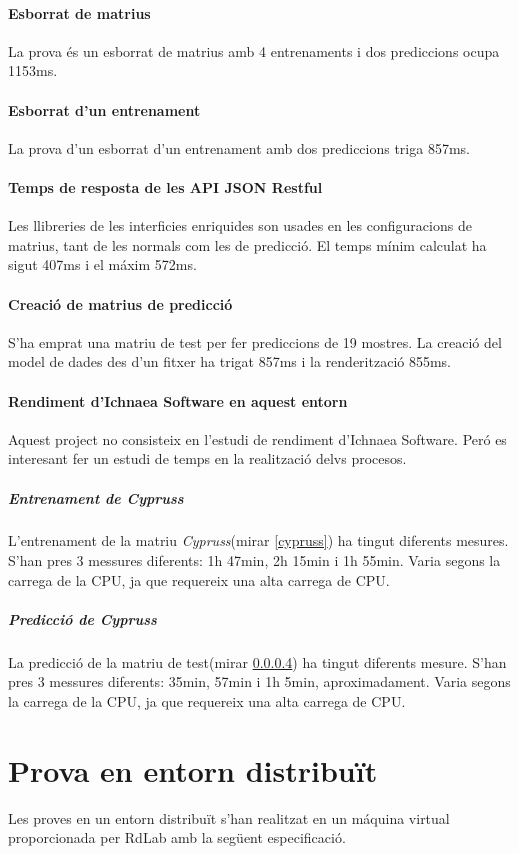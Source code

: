 \paragraph{Esborrat de matrius}
La prova \'{e}s un esborrat de matrius amb 4 entrenaments i dos prediccions ocupa 1153ms.

\paragraph{Esborrat d'un entrenament}
La prova d'un esborrat d'un entrenament amb dos prediccions triga 857ms.

\paragraph{Temps de resposta de les API JSON Restful}
Les llibreries de les interficies enriquides son usades en les configuracions de matrius, tant de les normals com les de predicci\'{o}. El temps m\'{i}nim calculat ha sigut 407ms i el m\'{a}xim 572ms.

\paragraph{Creaci\'{o} de matrius de predicci\'{o}}
\label{cypruss_test}
S'ha emprat una matriu de test per fer prediccions de 19 mostres. La creaci\'{o} del model de dades des d'un fitxer ha trigat 857ms i la renderitzaci\'{o} 855ms.

\paragraph{Rendiment d'Ichnaea Software en aquest entorn}
Aquest project no consisteix en l'estudi de rendiment d'Ichnaea Software. Per\'{o} es interesant fer un estudi de temps en la realitzaci\'{o} delvs procesos.

\subparagraph{Entrenament de \textit{Cypruss}}
L'entrenament de la matriu \textit{Cypruss}(mirar \ref{cypruss}) ha tingut diferents mesures. S'han pres 3 messures diferents: 1h 47min, 2h 15min i 1h 55min. Varia segons la carrega de la CPU, ja que requereix una alta carrega de CPU.

\subparagraph{Predicci\'{o} de \textit{Cypruss}}
La predicci\'{o} de la matriu de test(mirar \ref{cypruss_test}) ha tingut diferents mesure. S'han pres 3 messures diferents:
35min, 57min i 1h 5min, aproximadament. Varia segons la carrega de la CPU, ja que requereix una alta carrega de CPU.

\section{Prova en entorn distribuït}
Les proves en un entorn distribuït s'han realitzat en un m\'{a}quina virtual proporcionada per RdLab amb la següent especificaci\'{o}.

